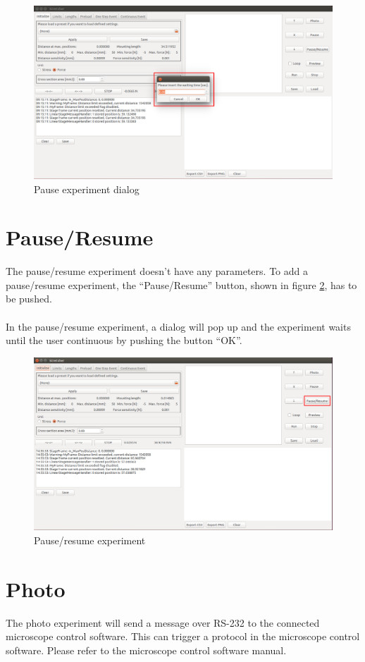 \begin{figure}[!ht]
	\centering
		\includegraphics[width=1.0\textwidth]{images/Pause2}
	\caption{Pause experiment dialog}
	\label{fig:pause2}
\end{figure}

\section{Pause/Resume}
The pause/resume experiment doesn't have any parameters. To add a pause/resume experiment, the ``Pause/Resume'' button, shown in figure \ref{fig:pauseresume}, has to be pushed.
\\
\\
In the pause/resume experiment, a dialog will pop up and the experiment waits until the user continuous by pushing the button ``OK''.

\begin{figure}[!ht]
	\centering
		\includegraphics[width=1.0\textwidth]{images/PauseResume}
	\caption{Pause/resume experiment}
	\label{fig:pauseresume}
\end{figure}

\section{Photo}
The photo experiment will send a message over RS-232 to the connected microscope control software. This can trigger a protocol in the microscope control software. Please refer to the microscope control software manual.